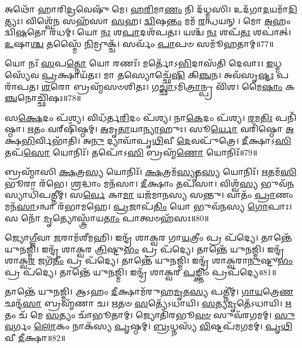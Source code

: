 𑌅𑌥𑍋᳴ 𑌹𑌾𑌰𑌿\-\ul{𑌦𑍍𑌰}\-𑌵𑍇𑌷𑍁᳴ 𑌮𑍇।
\-\ul{𑌹}\-\-\ul{𑌰𑌿}\-𑌮𑌾\-\ul{𑌣𑌂} 𑌨𑌿 𑌦᳴𑌧𑍍𑌮𑌸𑌿।
𑌉𑌦᳴𑌗𑌾\-\ul{𑌦}\-𑌯𑌮𑌾᳴\-\ul{𑌦𑌿}\-𑌤𑍍𑌯𑌃।
𑌵𑌿𑌶𑍍𑌵𑍇᳴\-\ul{𑌨} 𑌸𑌹᳴𑌸𑌾 \ul{𑌸}\-𑌹।
\-\ul{𑌦𑍍𑌵𑌿}\-𑌷\-\ul{𑌨𑍍𑌤𑌂} 𑌮𑌮᳴ \ul{𑌰}\-𑌨𑍍𑌧𑌯𑌨𑍍।
𑌮𑍋 \ul{𑌅}\-𑌹𑌂 𑌦𑍍𑌵𑌿᳴\-\ul{𑌷}\-𑌤𑍋 𑌰᳴𑌧𑌮𑍍।
𑌯𑍋 \ul{𑌨𑌃} 𑌶\-\ul{𑌪𑌾}\-𑌦𑌶᳴𑌪𑌤𑌃।
𑌯𑌶𑍍𑌚᳴ \ul{𑌨𑌃} 𑌶𑌪᳴\-\ul{𑌤𑌃} 𑌶𑌪𑌾॑𑌤𑍍।
\-\ul{𑌉}\-𑌷𑌾\-\ul{𑌶𑍍𑌚} 𑌤𑌸𑍍𑌮𑍈᳴ \ul{𑌨𑌿}\-𑌮𑍍𑌰𑍁𑌕𑍍𑌚᳴।
𑌸𑌰𑍍𑌵𑌂᳴ \ul{𑌪𑌾}\-𑌪𑍞 𑌸𑌮𑍂᳴𑌹𑌤𑌾𑌮𑍍॥77॥

𑌯𑍋 𑌨𑌃᳴ \ul{𑌸}\-𑌪\-\ul{𑌤𑍍𑌨𑍋} 𑌯𑍋 𑌰𑌣𑌃᳴।
𑌮𑌰𑍍𑌤𑍋᳴\-𑌽\-\ul{𑌭𑌿}\-𑌦𑌾𑌸᳴𑌤𑌿 𑌦𑍇𑌵𑌾𑌃।
\-\ul{𑌇}\-𑌧𑍍𑌮𑌸𑍍𑌯𑍇᳴𑌵 \ul{𑌪𑍍𑌰}\-𑌕𑍍𑌷𑌾𑌯᳴𑌤𑌃।
𑌮𑌾 𑌤𑌸𑍍𑌯𑍋𑌚𑍍𑌛𑍇᳴\-\ul{𑌷𑌿} 𑌕𑌿\-\ul{𑌞𑍍𑌚}\-𑌨।
𑌅𑌵᳴𑌸𑍃\-\ul{𑌷𑍍𑌟𑌃} 𑌪𑌰𑌾᳴𑌪𑌤।
\-\ul{𑌶}\-𑌰𑍋 𑌬𑍍𑌰𑌹𑍍𑌮᳴𑌸𑍞𑌶𑌿𑌤𑌃।
𑌗\-\ul{𑌚𑍍𑌛𑌾}\-\-𑌽𑌮𑌿\-\ul{𑌤𑍍𑌰𑌾}\-𑌨𑍍𑌪𑍍𑌰 𑌵𑌿᳴𑌶।
𑌮𑍈\-\ul{𑌷𑌾𑌂} 𑌕\-\ul{𑌞𑍍𑌚}\-𑌨𑍋𑌚𑍍𑌛𑌿᳴𑌷𑌃॥78॥

𑌸\-\ul{𑌕𑍍𑌷𑍇}\-𑌦𑌂 𑌪᳴𑌶𑍍𑌯।
𑌵𑌿𑌧᳴𑌰𑍍𑌤\-\ul{𑌰𑌿}\-𑌦𑌂 𑌪᳴𑌶𑍍𑌯।
𑌨𑌾\-\ul{𑌕𑍇}\-𑌦𑌂 𑌪᳴𑌶𑍍𑌯।
\-\ul{𑌰}\-𑌮\-\ul{𑌤𑌿𑌃} 𑌪𑌨𑌿᳴𑌷𑍍𑌠𑌾।
\-\ul{𑌋}\-𑌤𑌂 𑌵𑌰𑍍‌\mbox{}𑌷𑌿᳴𑌷𑍍𑌠𑌮𑍍।
\-\ul{𑌅}\-𑌮𑍃\-\ul{𑌤𑌾}\-𑌯𑌾\-\ul{𑌨𑍍𑌯𑌾}\-𑌹𑍁𑌃।
𑌸𑍂\-\ul{𑌰𑍍𑌯𑍋} 𑌵𑌰𑌿᳴𑌷𑍍𑌠𑍋 \ul{𑌅}\-𑌕𑍍𑌷\-\ul{𑌭𑌿}\-𑌰𑍍𑌵𑌿𑌭𑌾᳴𑌤𑌿।
𑌅\-\ul{𑌨𑍁} 𑌦𑍍𑌯𑌾𑌵𑌾᳴𑌪𑍃\-\ul{𑌥𑌿}\-𑌵𑍀 \ul{𑌦𑍇}\-𑌵𑌪𑍁᳴𑌤𑍍𑌰𑍇।
\-\ul{𑌦𑍀}\-𑌕𑍍𑌷𑌾𑌽\-\ul{𑌸𑌿} 𑌤𑌪᳴\-\ul{𑌸𑍋} 𑌯𑍋𑌨𑌿𑌃᳴।
𑌤𑌪𑍋᳴𑌽\-\ul{𑌸𑌿} 𑌬𑍍𑌰𑌹𑍍𑌮᳴\-\ul{𑌣𑍋} 𑌯𑍋𑌨𑌿𑌃᳴॥79॥

𑌬𑍍𑌰𑌹𑍍𑌮𑌾᳴𑌸𑌿 \ul{𑌕𑍍𑌷}\-𑌤𑍍𑌰\-\ul{𑌸𑍍𑌯} 𑌯𑍋𑌨𑌿𑌃᳴।
\-\ul{𑌕𑍍𑌷}\-𑌤𑍍𑌰𑌮᳴\-\ul{𑌸𑍍𑌯𑍃}\-𑌤\-\ul{𑌸𑍍𑌯} 𑌯𑍋𑌨𑌿𑌃᳴।
\-\ul{𑌋}\-𑌤𑌮᳴\-\ul{𑌸𑌿} 𑌭𑍂𑌰𑌾 𑌰᳴𑌭𑍇।
\-\ul{𑌶𑍍𑌰}\-𑌦𑍍𑌧𑌾𑌂 𑌮𑌨᳴𑌸𑌾।
\-\ul{𑌦𑍀}\-𑌕𑍍𑌷𑌾𑌂 𑌤𑌪᳴𑌸𑌾।
𑌵𑌿𑌶𑍍𑌵᳴\-\ul{𑌸𑍍𑌯} 𑌭𑍁𑌵᳴\-\ul{𑌨}\-𑌸𑍍𑌯𑌾𑌧𑌿᳴𑌪𑌤𑍍𑌨𑍀𑌮𑍍।
𑌸\-\ul{𑌰𑍍𑌵𑍇} 𑌕𑌾\-\ul{𑌮𑌾} 𑌯𑌜᳴𑌮𑌾𑌨𑌸𑍍𑌯 𑌸𑌨𑍍𑌤𑍁।
𑌵𑌾𑌤𑌂᳴ \ul{𑌪𑍍𑌰𑌾}\-𑌣𑌂 𑌮𑌨᳴\-\ul{𑌸𑌾}\-\-𑌽𑌨𑍍𑌵𑌾 𑌰᳴𑌭𑌾𑌮𑌹𑍇।
\-\ul{𑌪𑍍𑌰}\-𑌜𑌾𑌪᳴\-\ul{𑌤𑌿𑌂} 𑌯𑍋 𑌭𑍁𑌵᳴𑌨𑌸𑍍𑌯 \ul{𑌗𑍋}\-𑌪𑌾𑌃।
𑌸 𑌨𑍋᳴ \ul{𑌮𑍃}\-𑌤𑍍𑌯𑍋𑌸𑍍𑌤𑍍𑌰𑌾᳴𑌯\-\ul{𑌤𑌾𑌂} 𑌪𑌾𑌤𑍍𑌵𑍞𑌹᳴𑌸𑌃॥80॥

𑌜𑍍𑌯𑍋\-\ul{𑌗𑍍𑌜𑍀}\-𑌵𑌾 \ul{𑌜}\-𑌰𑌾𑌮᳴𑌶𑍀𑌮𑌹𑌿।
𑌇𑌨𑍍𑌦𑍍𑌰᳴ 𑌶𑌾𑌕𑍍𑌵𑌰 𑌗𑌾\-\ul{𑌯}\-𑌤𑍍𑌰𑍀𑌂 𑌪𑍍𑌰 𑌪᳴𑌦𑍍𑌯𑍇।
𑌤𑌾𑌨𑍍𑌤𑍇᳴ 𑌯𑍁𑌨𑌜𑍍𑌮𑌿।
𑌇𑌨𑍍𑌦𑍍𑌰᳴ 𑌶𑌾𑌕𑍍𑌵𑌰 \ul{𑌤𑍍𑌰𑌿}\-𑌷𑍍𑌟𑍁\-\ul{𑌭𑌂} 𑌪𑍍𑌰 𑌪᳴𑌦𑍍𑌯𑍇।
𑌤𑌾𑌨𑍍𑌤𑍇᳴ 𑌯𑍁𑌨𑌜𑍍𑌮𑌿।
𑌇𑌨𑍍𑌦𑍍𑌰᳴ 𑌶𑌾𑌕𑍍𑌵\-\ul{𑌰} 𑌜𑌗᳴\-\ul{𑌤𑍀𑌂} 𑌪𑍍𑌰 𑌪᳴𑌦𑍍𑌯𑍇।
𑌤𑌾𑌨𑍍𑌤𑍇᳴ 𑌯𑍁𑌨𑌜𑍍𑌮𑌿।
𑌇𑌨𑍍𑌦𑍍𑌰᳴ 𑌶𑌾𑌕𑍍𑌵𑌰𑌾\-\ul{𑌨𑍁}\-𑌷𑍍𑌟𑍁\-\ul{𑌭𑌂} 𑌪𑍍𑌰 𑌪᳴𑌦𑍍𑌯𑍇।
𑌤𑌾𑌨𑍍𑌤𑍇᳴ 𑌯𑍁𑌨𑌜𑍍𑌮𑌿।
𑌇𑌨𑍍𑌦𑍍𑌰᳴ 𑌶𑌾𑌕𑍍𑌵𑌰 \ul{𑌪}\-𑌙𑍍𑌕𑍍𑌤𑌿𑌂 𑌪𑍍𑌰𑌪᳴𑌦𑍍𑌯𑍇॥81॥

𑌤𑌾𑌨𑍍𑌤𑍇᳴ 𑌯𑍁𑌨𑌜𑍍𑌮𑌿।
𑌆𑌽𑌹𑌂 \ul{𑌦𑍀}\-𑌕𑍍𑌷𑌾𑌮᳴𑌰𑍁𑌹\-\ul{𑌮𑍃}\-𑌤\-\ul{𑌸𑍍𑌯} 𑌪𑌤𑍍𑌨𑍀॑𑌮𑍍।
\-\ul{𑌗𑌾}\-\-\ul{𑌯}\-𑌤𑍍𑌰𑍇\-\ul{𑌣} 𑌛𑌨𑍍𑌦᳴\-\ul{𑌸𑌾} 𑌬𑍍𑌰𑌹𑍍𑌮᳴𑌣𑌾 𑌚।
\-\ul{𑌋}\-𑌤𑍞 \ul{𑌸}\-𑌤𑍍𑌯𑍇᳴\-𑌽𑌧𑌾𑌯𑌿।
\-\ul{𑌸}\-𑌤𑍍𑌯\-\ul{𑌮𑍃}\-𑌤𑍇᳴\-𑌽𑌧𑌾𑌯𑌿।
\-\ul{𑌋}\-𑌤𑌂 𑌚᳴ 𑌮𑍇 \ul{𑌸}\-𑌤𑍍𑌯𑌂 𑌚𑌾᳴𑌭𑍂𑌤𑌾𑌮𑍍।
𑌜𑍍𑌯𑍋𑌤𑌿᳴𑌰𑌭𑍂\-\ul{𑌵}\-\-\ul{𑍞} 𑌸𑍁𑌵᳴𑌰𑌗𑌮𑌮𑍍।
\-\ul{𑌸𑍁}\-\-\ul{𑌵}\-𑌰𑍍𑌗𑌂 \ul{𑌲𑍋}\-𑌕𑌂 𑌨𑌾𑌕᳴𑌸𑍍𑌯 \ul{𑌪𑍃}\-𑌷𑍍𑌠𑌮𑍍।
\-\ul{𑌬𑍍𑌰}\-𑌧𑍍𑌨𑌸𑍍𑌯᳴ \ul{𑌵𑌿}\-𑌷𑍍𑌟𑌪᳴𑌮𑌗𑌮𑌮𑍍।
\-\ul{𑌪𑍃}\-\-\ul{𑌥𑌿}\-𑌵𑍀 \ul{𑌦𑍀}\-𑌕𑍍𑌷𑌾॥82॥

